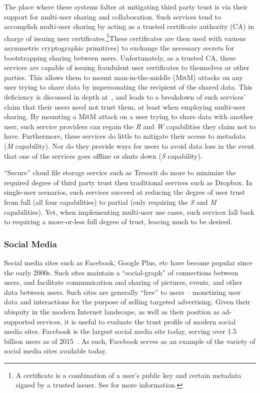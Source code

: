 The place where these systems falter at mitigating third party trust
is via their support for multi-user sharing and collaboration. Such
services tend to accomplish multi-user sharing by acting as a trusted
certificate authority (CA) in charge of issuing user
certificates.\footnote{A certificate is a combination of a user's
  public key and certain metadata signed by a trusted issuer. See for
  more information.}These certificates are then used with various
asymmetric cryptographic primitives) to exchange the necessary secrets
for bootstrapping sharing between users. Unfortunately, as a trusted
CA, these services are capable of issuing fraudulent user certificates
to themselves or other parties. This allows them to mount
man-in-the-middle (MitM) attacks on any user trying to share data by
impersonating the recipient of the shared data. This deficiency is
discussed in depth at~\cite{wilson2014}, and leads to a breakdown of
such services' claim that their users need not trust them, at least
when employing multi-user sharing. By mounting a MitM attack on a user
trying to share data with another user, such service providers can
regain the \emph{R} and \emph{W} capabilities they claim not to
have. Furthermore, these services do little to mitigate their access
to metadata (\emph{M} capability). Nor do they provide ways for users
to avoid data loss in the event that one of the services goes offline
or shuts down (\emph{S} capability).

``Secure'' cloud file storage service such as Tresorit do more to
minimize the required degree of third party trust then traditional
services such as Dropbox. In single-user scenarios, such services
succeed at reducing the degree of user trust from full (all four
capabilities) to partial (only requiring the \emph{S} and \emph{M}
capabilities). Yet, when implementing multi-user use cases, such
services fall back to requiring a more-or-less full degree of trust,
leaving much to be desired.

\subsubsection{Social Media}

Social media sites such as Facebook, Google Plus, etc have become
popular since the early 2000s. Such sites maintain a ``social-graph''
of connections between users, and facilitate communication and sharing
of pictures, events, and other data between users. Such sites are
generally ``free'' to users -- monetizing user data and interactions
for the purpose of selling targeted advertising. Given their ubiquity
in the modern Internet landscape, as well as their position as
ad-supported services, it is useful to evaluate the trust profile of
modern social media sites. Facebook is the largest social media site
today, serving over 1.5 billion users as of 2015~\cite{foster2014}. As
such, Facebook serves as an example of the variety of social media
sites available today.

